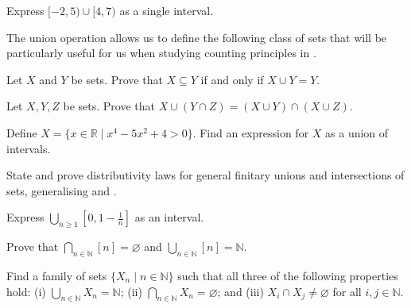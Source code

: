 \begin{exercise}
Express $[-2,5) \cup [4,7)$ as a single interval.
\end{exercise}

The union operation allows us to define the following class of sets that will be particularly useful for us when studying counting principles in .

\begin{exercise}
Let $X$ and $Y$ be sets. Prove that $X \subseteq Y$ if and only if $X \cup Y = Y$.
\end{exercise}


\begin{exercise}
\label{exUnionDistributesOverIntersection}
Let $X,Y,Z$ be sets. Prove that $X \cup (Y \cap Z) = (X \cup Y) \cap (X \cup Z)$.
\end{exercise}


\begin{exercise}
Define $X = \{ x \in \mathbb{R} \mid x^4-5x^2+4 > 0 \}$. Find an expression for $X$ as a union of intervals.
\end{exercise}

\begin{exercise}
State and prove distributivity laws for general finitary unions and intersections of sets, generalising  and .
\end{exercise}


\begin{exercise}
Express $\displaystyle\bigcup_{n \ge 1} \textstyle[0,1-\frac{1}{n}]$ as an interval.
\end{exercise}

\begin{exercise}
Prove that $\displaystyle\bigcap_{n \in \mathbb{N}} [n] = \varnothing$ and $\displaystyle\bigcup_{n \in \mathbb{N}} [n] = \mathbb{N}$.
\end{exercise}

\begin{exercise}
\label{exSubsetsFiniteIntersectionInhabitedInfiniteIntersectionEmpty}
Find a family of sets $\{ X_n \mid n \in \mathbb{N} \}$ such that all three of the following properties hold: (i) $\displaystyle\bigcup_{n \in \mathbb{N}} X_n = \mathbb{N}$; (ii) $\displaystyle\bigcap_{n \in \mathbb{N}} X_n = \varnothing$; and (iii) $X_i \cap X_j \ne \varnothing$ for all $i,j \in \mathbb{N}$.
\end{exercise}


